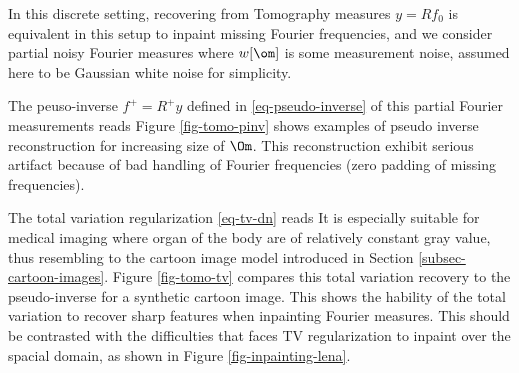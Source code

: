 In this discrete setting, recovering from Tomography measures $y=R f_0$ is equivalent in this setup to inpaint missing Fourier frequencies, and we consider partial noisy Fourier measures
where $w[\om]$ is some measurement noise, assumed here to be Gaussian white noise for simplicity.


The peuso-inverse $f^+ = R^+ y$ defined in \eqref{eq-pseudo-inverse} of this partial Fourier measurements  reads 
Figure \ref{fig-tomo-pinv} shows examples of pseudo inverse reconstruction for increasing size of $\Om$. This reconstruction exhibit serious artifact because of bad handling of Fourier frequencies (zero padding of missing frequencies).

The total variation regularization \eqref{eq-tv-dn} reads
It is especially suitable for medical imaging where organ of the body are of relatively constant gray value, thus resembling to the cartoon image model introduced in Section \ref{subsec-cartoon-images}. Figure \ref{fig-tomo-tv} compares this total variation recovery to the pseudo-inverse for a synthetic cartoon image. This shows the hability of the total variation to recover sharp features when inpainting Fourier measures. This should be contrasted with the difficulties that faces TV regularization to inpaint over the spacial domain, as shown in Figure \ref{fig-inpainting-lena}.

